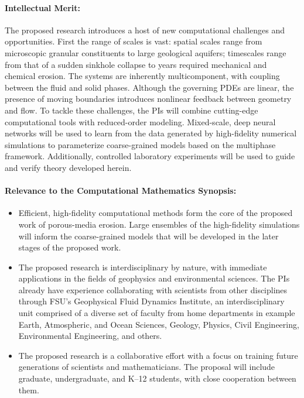 \documentclass[11pt]{article}
\begin{document}
\paragraph{Intellectual Merit:} The proposed research introduces a host of new computational challenges and opportunities. First the range of scales is vast: spatial scales range from microscopic granular constituents to large geological aquifers; timescales range from that of a sudden sinkhole collapse to years required mechanical and chemical erosion. The systems are inherently multicomponent, with coupling between the fluid and solid phases. Although the governing PDEs are linear, the presence of moving boundaries introduces nonlinear feedback between geometry and flow. To tackle these challenges, the PIs will combine cutting-edge computational tools with reduced-order modeling. Mixed-scale, deep neural networks will be used to learn from the data generated by high-fidelity numerical simulations to parameterize coarse-grained models based on the multiphase framework. Additionally, controlled laboratory experiments will be used to guide and verify theory developed herein.  

\paragraph{Relevance to the Computational Mathematics Synopsis:}
\begin{itemize}[noitemsep]
  \item Efficient, high-fidelity computational methods form the core of the proposed work of porous-media erosion. Large ensembles of the high-fidelity simulations will inform the coarse-grained models that will be developed in the later stages of the proposed work.
  \item The proposed research is interdisciplinary by nature, with immediate applications in the fields of geophysics and environmental sciences. The PIs already have experience collaborating with scientists from other disciplines through FSU's Geophysical Fluid Dynamics Institute, an interdisciplinary unit comprised of a diverse set of faculty from home departments in example Earth, Atmospheric, and Ocean Sciences, Geology, Physics, Civil Engineering, Environmental Engineering, and others.
  \item The proposed research is a collaborative effort with a focus on training future generations of scientists and mathematicians. The proposal will include graduate, undergraduate, and K--12 students, with close cooperation between them.
\end{itemize}
\end{document}
